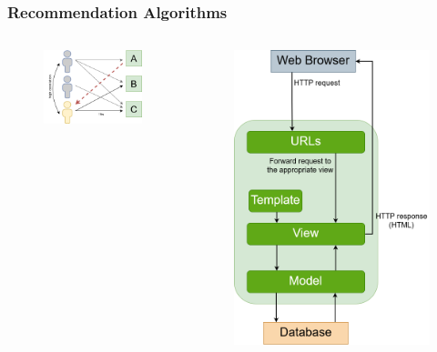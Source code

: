 \begin{frame}
    \frametitle{Recommendation Algorithms}
    \begin{columns}
        \begin{column}{0.5\textwidth}
            \begin{figure}
                \centering
                \includegraphics[scale=0.5]{images/UB_CF_ex}
           \end{figure}
        \end{column}
        \begin{column}{0.5\textwidth}
            \begin{figure}
                \centering
                \includegraphics[scale=0.5]{images/IB_CF_ex}

\end{figure}
\end{column}
\end{columns}
\end{frame}

